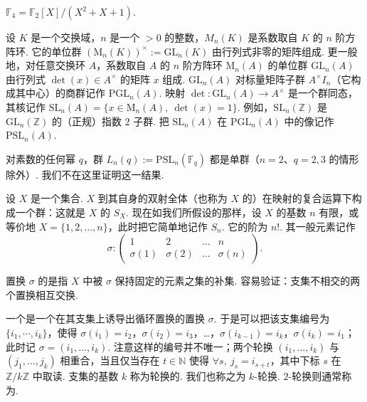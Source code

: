 \begin{example*}
$\mathbb{F}_4=\mathbb{F}_2[X]/(X^2+X+1)$.
\end{example*}

设 $K$ 是一个交换域，$n$ 是一个 $>0$ 的整数，$M_n(K)$ 是系数取自 $K$ 的 $n$ 阶方阵环. 它的单位群 $(\mathrm{M}_n(K))^\times:=\mathrm{GL}_n(K)$ 由行列式非零的矩阵组成. 更一般地，对任意交换环 $A$，系数取自 $A$ 的 $n$ 阶方阵环 $\mathrm{M}_n(A)$ 的单位群 $\mathrm{GL}_n(A)$ 由行列式 $\det(x)\in A^\times$ 的矩阵 $x$ 组成. $\mathrm{GL}_n(A)$ 对标量矩阵子群 $A^\times I_n$（它构成其中心）的商群记作 $\mathrm{PGL}_n(A)$. 映射 $\det:\mathrm{GL}_n(A)\to A^\times$ 是一个群同态，其核记作 $\mathrm{SL}_n(A)=\{x\in\mathrm{M}_n(A),\ \det(x)=1\}$. 例如，$\mathrm{SL}_n(\mathbb{Z})$ 是 $\mathrm{GL}_n(\mathbb{Z})$ 的（正规）指数 $2$ 子群. 把 $\mathrm{SL}_n(A)$ 在 $\mathrm{PGL}_n(A)$ 中的像记作 $\mathrm{PSL}_n(A)$.

\begin{remark*}
对素数的任何幂 $q$，群 $L_n(q):=\mathrm{PSL}_n(\mathbb{F}_q)$ 都是单群（$n=2$、$q=2,3$ 的情形除外）. 我们不在这里证明这一结果.
\end{remark*}

\begin{numpara}[对称群]\label{np:fg-1-2-4}
设 $X$ 是一个集合. $X$ 到其自身的双射全体（也称为 $X$ 的）在映射的复合运算下构成一个群：这就是 $X$ 的 $S_X$. 现在如我们所假设的那样，设 $X$ 的基数 $n$ 有限，或等价地 $X=\{1,2,\ldots,n\}$，此时把它简单地记作 $S_n$. 它的阶为 $n!$. 其一般元素记作
\[
\sigma:\begin{pmatrix}1 & 2 & \dots & n\\ \sigma(1) & \sigma(2) & \dots & \sigma(n)\end{pmatrix}.
\]
\end{numpara}

置换 $\sigma$ 的是指 $X$ 中被 $\sigma$ 保持固定的元素之集的补集. 容易验证：支集不相交的两个置换相互交换.

一个是一个在其支集上诱导出循环置换的置换 $\sigma$. 于是可以把该支集编号为 $\{i_1,\cdots,i_k\}$，使得 $\sigma(i_1)=i_2$，$\sigma(i_2)=i_3$，…，$\sigma(i_{k-1})=i_k$，$\sigma(i_k)=i_1$；此时记 $\sigma=(i_1,\ldots,i_k)$. 注意这样的编号并不唯一；两个轮换 $(i_1,\ldots,i_k)$ 与 $(j_1,\ldots,j_k)$ 相重合，当且仅当存在 $t\in\mathbb{N}$ 使得 $\forall s,\ j_s=i_{s+t}$，其中下标 $s$ 在 $\mathbb{Z}/k\mathbb{Z}$ 中取读. 支集的基数 $k$ 称为轮换的. 我们也称之为 $k$-轮换. $2$-轮换则通常称为.


